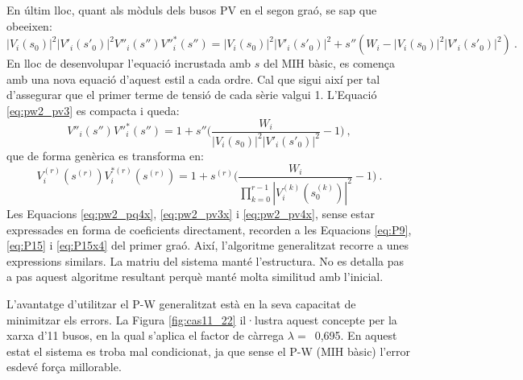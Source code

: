 En últim lloc, quant als mòduls dels busos PV en el segon graó, se sap que obeeixen:
\begin{equation}
    |V_i(s_0)|^2|V'_i(s'_0)|^2V''_i(s'')V''^*_i(s'')=|V_i(s_0)|^2|V'_i(s'_0)|^2+s''(W_i-|V_i(s_0)|^2|V'_i(s'_0)|^2)\ .
    \label{eq:pw2_pv3}
\end{equation}
En lloc de desenvolupar l'equació incrustada amb $s$ del MIH bàsic, es comença amb una nova equació d'aquest estil a cada ordre. Cal que sigui així per tal d'assegurar que el primer terme de tensió de cada sèrie valgui 1. L'Equació \ref{eq:pw2_pv3} es compacta i queda:
\begin{equation}
    V''_i(s'')V''^*_i(s'')=1+s''\biggl(\frac{W_i}{|V_i(s_0)|^2|V'_i(s'_0)|^2}-1\biggr)\ ,
    \label{eq:pw2_pv4}
\end{equation}
que de forma genèrica es transforma en:
\begin{equation}
    V^{(r)}_i(s^{(r)})V^{*(r)}_i(s^{(r)})=1+s^{(r)}\biggl(\frac{W_i}{\prod_{k=0}^{r-1}|V^{(k)}_i(s^{(k)}_0)|^2}-1\biggr)\ .
    \label{eq:pw2_pv4x}
\end{equation}
Les Equacions \ref{eq:pw2_pq4x}, \ref{eq:pw2_pv3x} i \ref{eq:pw2_pv4x}, sense estar expressades en forma de coeficients directament, recorden a les Equacions \ref{eq:P9}, \ref{eq:P15} i \ref{eq:P15x4} del primer graó. Així, l'algoritme generalitzat recorre a unes expressions similars. La matriu del sistema manté l'estructura. No es detalla pas a pas aquest algoritme resultant perquè manté molta similitud amb l'inicial.

L'avantatge d'utilitzar el P-W generalitzat està en la seva capacitat de minimitzar els errors. La Figura \ref{fig:cas11_22} il·lustra aquest concepte per la xarxa d'11 busos, en la qual s'aplica el factor de càrrega $\lambda=$\ 0,695. En aquest estat el sistema es troba mal condicionat, ja que sense el P-W (MIH bàsic) l'error esdevé força millorable.

